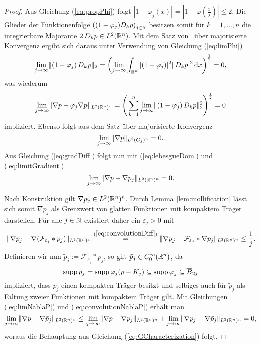 \begin{proof}
  Aus Gleichung (\ref{eq:propPhi}) folgt $|1 - \varphi_j(x)| = |1 - \varphi(\tfrac{x}{j})| \leq 2$. 
  Die Glieder der Funktionenfolge $\left((1 - \varphi_j) D_k p\right)_{j \in \mathbb{N}}$ besitzen somit für $k = 1, \dots, n$ die integrierbare Majorante $2\, D_k p \in L^2(\mathbb{R}^n)$.
  Mit dem Satz von \lebesgue\ über majorisierte Konvergenz ergibt sich daraus unter Verwendung von Gleichung (\ref{eq:limPhi})
  $$
  \lim_{j \to \infty} \lVert (1 - \varphi_j) \,D_k p \rVert_2 
  = \left( \lim_{j \to \infty} \int_{\mathbb{R}^n} |(1 - \varphi_j)|^2 |\,D_k p|^2 \, {\operatorname{d}\!{x}} \right)^{\frac{1}{2}}
  = 0,
  $$
  was wiederum
  \begin{equation}
    \label{eq:lebesgueDom}
  \lim_{j \to \infty} \lVert \nabla p - \varphi_j \nabla p \rVert_{L^2(\mathbb{R}^n)^n}
  = \left(\, \sum_{k = 1}^n \lim_{j \to \infty} \lVert (1 - \varphi_j)\, D_k p \rVert_2^2  \right)^\frac{1}{2} = 0
  \end{equation}
  impliziert.
  Ebenso folgt aus dem Satz über majorisierte Konvergenz 
  \begin{equation}
    \label{eq:limitGradient}
  \lim_{j \to \infty} \lVert \nabla p \rVert_{L^2(G_j)^n}
  = 0.
  \end{equation}
  Aus Gleichung (\ref{eq:gradDiff}) folgt nun mit (\ref{eq:lebesgueDom}) und (\ref{eq:limitGradient})
  \begin{equation}
    \label{eq:limNablaP}
    \lim_{j \to \infty} \lVert \nabla p - \nabla p_j \rVert_{L^2(\mathbb{R}^n)^n} = 0.
  \end{equation}

  Nach Konstruktion gilt $\nabla p_j \in L^2(\mathbb{R}^n)^n$.
  Durch Lemma \ref{lem:mollification} lässt sich somit $\nabla p_j$ als Grenzwert von glatten Funktionen mit kompaktem Träger darstellen. Für alle $j \in \mathbb{N}$ existiert daher ein $\varepsilon_j > 0$ mit
  \begin{equation}
    \label{eq:convolutionNablaP}
  \lVert \nabla p_j - \nabla (\mathcal{F}_{\varepsilon_j} \ast p_j) \rVert_{L^2(\mathbb{R}^n)^n}
  \overset{(\ref{eq:convolutionDiff})}{=} \lVert \nabla p_j - \mathcal{F}_{\varepsilon_j} \ast \nabla p_j \rVert_{L^2(\mathbb{R}^n)^n}
  \leq \frac{1}{j}.
  \end{equation}
  Definieren wir nun $\tilde p_j := \mathcal{F}_{\varepsilon_j} \ast p_j$, so gilt $\tilde p_j \in C_0^\infty(\mathbb{R}^n)$, da 
  $$
  \operatorname{supp} p_j = \operatorname{supp} \varphi_j(p - K_j) 
  \subseteq \operatorname{supp} \varphi_j
  \subseteq \overline B_{2j}
  $$
  impliziert, dass $p_j$ einen kompakten Träger besitzt und selbiges auch für $\tilde p_j$ als Faltung zweier Funktionen mit kompaktem Träger gilt.
  Mit Gleichungen (\ref{eq:limNablaP}) und (\ref{eq:convolutionNablaP}) erhält man
  $$
  \lim_{j \to \infty} \lVert \nabla p - \nabla \tilde p_j \rVert_{L^2(\mathbb{R}^n)^n}
  \leq 
  \lim_{j \to \infty} \lVert \nabla p - \nabla p_j \rVert_{L^2(\mathbb{R}^n)^n} + \lim_{j \to \infty} \lVert \nabla p_j - \nabla \tilde p_j \rVert_{L^2(\mathbb{R}^n)^n}
  = 0, 
  $$
  woraus die Behauptung aus Gleichung (\ref{eq:GCharacterization}) folgt.


\end{proof}
